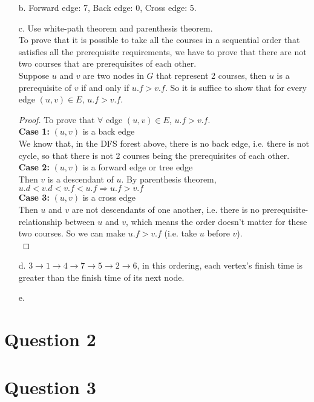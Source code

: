 \documentclass[10pt]{article}
\begin{document}
\begin{itemize}
\item[b.] Forward edge: 7, Back edge: 0, Cross edge: 5.
\item[c.] Use white-path theorem and parenthesis theorem.\\
To prove that it is possible to take all the courses
in a sequential order that satisfies all the prerequisite requirements, we have to prove that there are not two courses that are prerequisites of each other. \\
Suppose $u$ and $v$ are two nodes in $G$ that represent 2 courses, then $u$ is a prerequisite of $v$ if and only if $u.f>v.f$. So it is suffice to show that for every edge $(u,v)\in E$, $u.f>v.f$.
\begin{proof} To prove that $\forall$ edge $(u,v)\in E$, $u.f>v.f$.\\
\textbf{Case 1:} $(u, v)$ is a back edge\\
We know that, in the DFS forest above, there is no back edge, i.e. there is not cycle, so that there is not 2 courses being the prerequisites of each other.\\
\textbf{Case 2:} $(u,v)$ is a forward edge or tree edge\\
Then $v$ is a descendant of $u$. By parenthesis theorem, $u.d<v.d<v.f<u.f\Rightarrow u.f>v.f$\\
\textbf{Case 3:} $(u,v)$ is a cross edge\\
Then $u$ and $v$ are not descendants of one another, i.e. there is no prerequisite-relationship between $u$ and $v$, which means the order doesn't matter for these two courses. So we can make $u.f>v.f$ (i.e. take $u$ before $v$).\\
\end{proof}
\item[d.] $3\rightarrow 1\rightarrow 4\rightarrow 7\rightarrow 5\rightarrow 2\rightarrow 6$, in this ordering, each vertex's finish time is greater than the finish time of its next node.
\item[e.]
\end{itemize}

\section*{Question 2}


\section*{Question 3}
\end{document}
